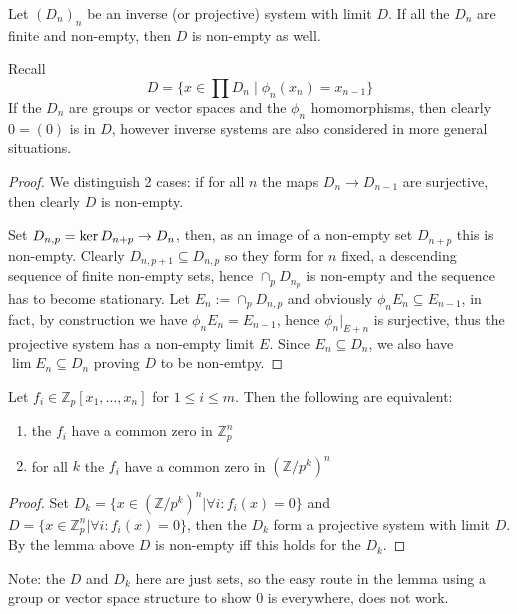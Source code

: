 \begin{lemma}
  Let $(D_n)_n$ be an inverse (or projective) system with limit $D$. If all the
  $D_n$ are finite and non-empty, then $D$ is non-empty as well.
\end{lemma}
\begin{remark}
  Recall
  $$D = \{x\in \prod D_n \mid \phi_n(x_n) = x_{n-1}\}$$
  If the $D_n$ are groups or vector spaces and the $\phi_n$ homomorphisms, then
  clearly $0 = (0)$ is in $D$, however inverse systems are also considered 
  in more general situations.
\end{remark}
\begin{proof}
  We distinguish 2 cases: if for all $n$ the maps $D_n\to D_{n-1}$ are
  surjective, then clearly $D$ is non-empty.

  Set $D_{n, p} = \mathop{\rm ker}\nolimits D_{n+p} \to D_n$, then, as an image of a non-empty
  set $D_{n+p}$ this is non-empty. Clearly $D_{n, p+1} \subseteq D_{n, p}$
  so they form for $n$ fixed, a descending sequence of finite non-empty
  sets, hence $\cap_p D_{n_p}$ is non-empty and the sequence has to become 
  stationary. Let $E_n := \cap_p D_{n, p}$ and obviously
  $\phi_n E_n \subseteq E_{n-1}$, in fact, by construction we have
  $\phi_n E_n = E_{n-1}$, hence $\phi_n|_{E+n}$ is surjective, thus
  the projective system has a non-empty limit $E$. Since $E_n \subseteq D_n$,
  we also have $\lim E_n \subseteq D_n$ proving $D$ to be non-emtpy.
\end{proof}

\begin{lemma}
  Let $f_i\in \mathbb Z_p[x_1, \ldots, x_n]$ for $1\le i\le m$. Then the following
  are equivalent:
  \begin{enumerate}
    \item the $f_i$ have a common zero in $\mathbb Z_p^n$
    \item for all $k$ the $f_i$ have a common zero in $(\mathbb Z/p^k)^n$
  \end{enumerate}
\end{lemma}
\begin{proof}
  Set $D_k = \{x\in (\mathbb Z/p^k)^n | \forall i: f_i(x) = 0\}$
  and $D = \{ x\in \mathbb Z_p^n | \forall i: f_i(x) = 0\}$, then
  the $D_k$ form a projective system with limit $D$. By the lemma above
  $D$ is non-empty iff this holds for the $D_k$.
\end{proof}
Note: the $D$ and $D_k$ here are just sets, so the easy route in the lemma using
a group or vector space structure to show $0$ is everywhere, does not
work.

